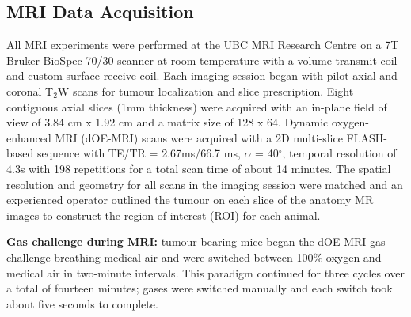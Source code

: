 \subsection{MRI Data Acquisition}
\label{doemri_mrianalysis1}
All MRI experiments were performed at the UBC MRI Research Centre on a 7T Bruker BioSpec 70/30 scanner at room temperature with a volume transmit coil and custom surface receive coil.
Each imaging session began with pilot axial and coronal T$_2$W scans for tumour localization and slice prescription.
Eight contiguous axial slices (1mm thickness) were acquired with an in-plane field of view of 3.84 cm x 1.92 cm and a matrix size of 128 x 64.
Dynamic oxygen-enhanced MRI (dOE-MRI) scans were acquired with a 2D multi-slice FLASH-based sequence with TE/TR = 2.67ms/66.7 ms, $\alpha$ = 40$^\circ$, temporal resolution of 4.3s with 198 repetitions for a total scan time of about 14 minutes.
The spatial resolution and geometry for all scans in the imaging session were matched and an experienced operator outlined the tumour on each slice of the anatomy MR images to construct the region of interest (ROI) for each animal.

\noindent\textbf{Gas challenge during MRI:} tumour-bearing mice began the \ac{dOE-MRI} gas challenge breathing medical air and were switched between 100\% oxygen and medical air in two-minute intervals.
This paradigm continued for three cycles over a total of fourteen minutes; gases were switched manually and each switch took about five seconds to complete.

